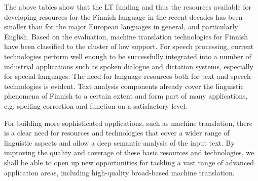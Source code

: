 \documentclass[]{../../metanetpaper}
\begin{document}
\begin{Parallel}[c]{77mm}{77mm}
{The above tables show that the LT funding and thus the resources available for
developing resources for the Finnish language in the recent decades has been
smaller than for the major European languages in general, and particularly
English. Based on the evaluation, machine translation technologies for Finnish
have been classified to the cluster of low support. For speech processing,
current technologies perform well enough to be successfully integrated into a
number of industrial applications such as spoken dialogue and dictation
systems, especially for special languages. The need for language resources both
for text and speech technologies is evident. Text analysis components already
cover the linguistic phenomena of Finnish to a certain extent and form part of
many applications, e.g. spelling correction and function on a satisfactory
level.

For building more sophisticated applications, such as machine translation,
there is a clear need for resources and technologies that cover a wider range
of linguistic aspects and allow a deep semantic analysis of the input text. By
improving the quality and coverage of these basic resources and technologies,
we shall be able to open up new opportunities for tackling a vast range of
advanced application areas, including high-quality broad-based machine
translation.
}

\ParallelPar


\end{Parallel}
\end{document}
